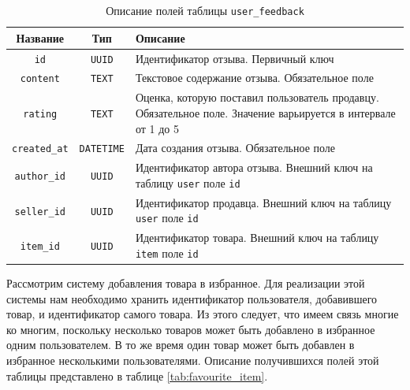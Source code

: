 \documentclass[a4paper,14pt]{extarticle}
\begin{document}
\begin{center}
    \begin{longtable}{|c|c|>{\centering\arraybackslash}m{10.5cm}|}
        \caption{Описание полей таблицы \texttt{user\_feedback}}
        \label{tab:user_feedback}
        \\
        \hline
        \textbf{Название}    & \textbf{Тип}      & \textbf{Описание}                                                                                             \\
        \hline
        \texttt{id}          & \texttt{UUID}     & Идентификатор отзыва. Первичный ключ                                                                          \\
        \hline
        \texttt{content}     & \texttt{TEXT}     & Текстовое содержание отзыва. Обязательное поле                                                                \\
        \hline
        \texttt{rating}      & \texttt{TEXT}     & Оценка, которую поставил пользователь продавцу. Обязательное поле. Значение варьируется в интервале от 1 до 5 \\
        \hline
        \texttt{created\_at} & \texttt{DATETIME} & Дата создания отзыва. Обязательное поле                                                                       \\
        \hline
        \texttt{author\_id}  & \texttt{UUID}     & Идентификатор автора отзыва. Внешний ключ на таблицу \texttt{user} поле \texttt{id}                           \\
        \hline
        \texttt{seller\_id}  & \texttt{UUID}     & Идентификатор продавца. Внешний ключ на таблицу \texttt{user} поле \texttt{id}                                \\
        \hline
        \texttt{item\_id}    & \texttt{UUID}     & Идентификатор товара. Внешний ключ на таблицу \texttt{item} поле \texttt{id}                                  \\
        \hline
    \end{longtable}
\end{center}

Рассмотрим систему добавления товара в избранное. Для реализации этой системы нам необходимо хранить идентификатор пользователя, добавившего товар, и идентификатор самого товара. Из этого следует, что имеем связь многие ко многим, поскольку несколько товаров может быть добавлено в избранное одним пользователем. В то же время один товар может быть добавлен в избранное несколькими пользователями. Описание получившихся полей этой таблицы представлено в таблице \ref{tab:favourite_item}.
\end{document}
